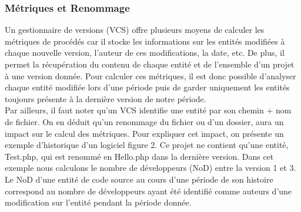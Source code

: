 \subsubsection{Métriques et Renommage}
Un gestionnaire de versions (VCS) offre plusieurs moyens de calculer les métriques de procédés car il stocke les informations sur les entités modifiées à chaque nouvelle version, l'auteur de ces modifications, la date, etc. De plus, il permet la récupération du contenu de chaque entité et de l'ensemble d'un projet à une version donnée. Pour calculer ces métriques, il est donc possible d'analyser chaque entité modifiée lors d'une période puis de garder uniquement les entités toujours présente à la dernière version de notre période.\\
Par ailleurs, il faut noter qu'un VCS identifie une entité par son chemin + nom de fichier. On en déduit qu'un renommage du fichier ou d'un dossier, aura un impact sur le calcul des métriques. Pour expliquer cet impact, on présente un exemple d'historique d'un logiciel figure 2. Ce projet ne contient qu'une entité, Test.php, qui est renommé en Hello.php dans la dernière version. Dans cet exemple nous calculons le nombre de développeurs (NoD) entre la version 1 et 3.\\
Le NoD d'une entité de code source au cours d'une période de son histoire correspond au nombre de développeurs ayant été identifié comme auteurs d'une modification sur l'entité pendant la période donnée.\\

